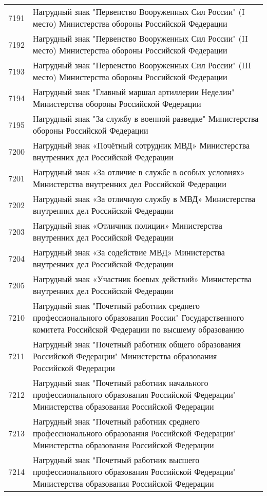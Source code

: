 \documentclass[10pt, a4paper, titlepage]{article}
\begin{document}
\begin{center}
\begin{longtable}{rp{}}
        7191 & Нагрудный знак "Первенство Вооруженных Сил России" (I место) Министерства обороны Российской Федерации \\
        7192 & Нагрудный знак "Первенство Вооруженных Сил России" (II место) Министерства обороны Российской Федерации \\
        7193 & Нагрудный знак "Первенство Вооруженных Сил России" (III место) Министерства обороны Российской Федерации \\
        7194 & Нагрудный знак "Главный маршал артиллерии Неделин" Министерства обороны Российской Федерации \\
        7195 & Нагрудный знак "За службу в военной разведке" Министерства обороны Российской Федерации \\
        7200 & Нагрудный знак «Почётный сотрудник МВД» Министерства внутренних дел Российской Федерации \\
        7201 & Нагрудный знак «За отличие в службе в особых условиях» Министерства внутренних дел Российской Федерации \\
        7202 & Нагрудный знак «За отличную службу в МВД» Министерства внутренних дел Российской Федерации \\
        7203 & Нагрудный знак «Отличник полиции» Министерства внутренних дел Российской Федерации \\
        7204 & Нагрудный знак «За содействие МВД» Министерства внутренних дел Российской Федерации \\
        7205 & Нагрудный знак «Участник боевых действий» Министерства внутренних дел Российской Федерации \\
        7210 & Нагрудный знак "Почетный работник среднего профессионального образования России" Государственного комитета Российской Федерации по высшему образованию \\
        7211 & Нагрудный знак "Почетный работник общего образования Российской Федерации" Министерства образования Российской Федерации \\
        7212 & Нагрудный знак "Почетный работник начального профессионального образования Российской Федерации" Министерства образования Российской Федерации \\
        7213 & Нагрудный знак "Почетный работник среднего профессионального образования Российской Федерации" Министерства образования Российской Федерации \\
        7214 & Нагрудный знак "Почетный работник высшего профессионального образования Российской Федерации" Министерства образования Российской Федерации \\

\end{longtable}
\end{center}
\end{document}
